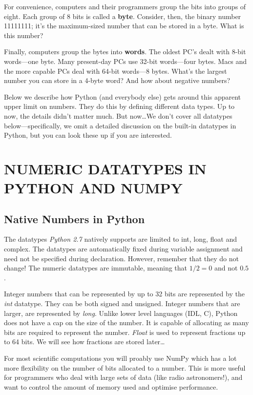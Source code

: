 \documentclass[psfig,preprint]{aastex}
\begin{document}
	For convenience, computers and their programmers group the bits
into groups of eight. Each group of 8 bits is called a {\bf byte}.
Consider, then, the binary number 11111111; it's the maximum-sized
number that can be stored in a byte. What is this number? 

	Finally, computers group the bytes into {\bf words}.  The oldest
PC's dealt with 8-bit words---one byte.  Many present-day PCs use 32-bit
words---four bytes.  Macs and the more capable PCs deal with 64-bit
words---8 bytes. What's the largest number you can store in a 4-byte
word? And how about negative numbers?

	Below we describe how Python (and everybody else) gets around this
apparent upper limit on numbers.  They do this by defining different
data types.  Up to now, the details didn't matter much.  But now\dots We
don't cover all datatypes below---specifically, we omit a detailed 
discussion on the built-in datatypes in Python, but you can look these 
up if you are interested.

\section{NUMERIC DATATYPES IN PYTHON AND NUMPY}
\subsection{Native Numbers in Python}
	The datatypes {\it Python 2.7} natively supports are limited to int, 
long, float and complex. The datatypes are automatically fixed during 
variable assignment and need not be specified during declaration. However, 
remember that they do not change! The numeric datatypes are immutable, 
meaning that $1/2 = 0$ and not $0.5$.

	Integer numbers that can be represented by up to 32 bits are 
represented by the {\it int} datatype. They can be both signed and unsigned.
Integer numbers that are larger, are represented by {\it long}. Unlike lower level 
languages (IDL, C), Python does not have a cap on the size of the number. It 
is capable of allocating as many bits are required to represent the number. 
{\it Float} is used to represent fractions up to 64 bits. We will see how 
fractions are stored later\dots  

	For most scientific computations you will proably use NumPy 
which has a lot more flexibility on the number of bits allocated to a number. 
This is more useful for programmers who deal with large sets of data (like radio 
astronomers!), and want to control the amount of memory used and optimise performance.
\end{document}
